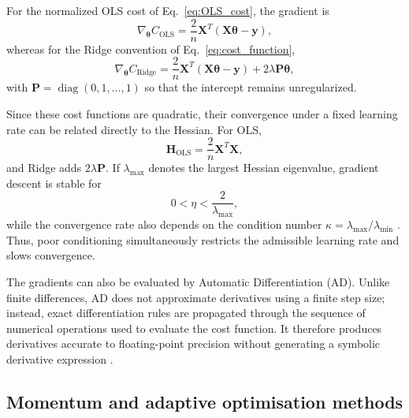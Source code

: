 \documentclass[aps,rmp,reprint,amsmath,amssymb,graphicx,longbibliography]{revtex4-1}
\begin{document}
For the normalized OLS cost of Eq.~\eqref{eq:OLS_cost}, the gradient is
\begin{equation}
    \nabla_{\boldsymbol{\theta}} C_{\mathrm{OLS}}
    =
    \frac{2}{n}
    \mathbf{X}^{T}
    \left(
    \mathbf{X}\boldsymbol{\theta}-\mathbf{y}
    \right),
    \label{eq:OLS_grad}
\end{equation}
whereas for the Ridge convention of Eq.~\eqref{eq:cost_function},
\begin{equation}
    \nabla_{\boldsymbol{\theta}} C_{\mathrm{Ridge}}
    =
    \frac{2}{n}
    \mathbf{X}^{T}
    \left(
    \mathbf{X}\boldsymbol{\theta}-\mathbf{y}
    \right)
    +
    2\lambda\mathbf{P}\boldsymbol{\theta},
    \label{eq:ridge_grad}
\end{equation}
with $\mathbf{P}=\operatorname{diag}(0,1,\ldots,1)$ so that the intercept
remains unregularized.

Since these cost functions are quadratic, their convergence under a fixed
learning rate can be related directly to the Hessian. For OLS,
\begin{equation}
    \mathbf{H}_{\mathrm{OLS}}
    =
    \frac{2}{n}\mathbf{X}^{T}\mathbf{X},
\end{equation}
and Ridge adds $2\lambda\mathbf{P}$. If
$\lambda_{\max}$ denotes the largest Hessian eigenvalue, gradient descent is
stable for
\begin{equation}
    0 < \eta < \frac{2}{\lambda_{\max}},
    \label{eq:gd_stability}
\end{equation}
while the convergence rate also depends on the condition number
$\kappa=\lambda_{\max}/\lambda_{\min}$ \cite{HjorthJensen2026MLPSCh4}. Thus, poor conditioning simultaneously restricts the admissible learning rate and slows convergence.

The gradients can also be evaluated by Automatic Differentiation (AD). Unlike
finite differences, AD does not approximate derivatives using a finite step
size; instead, exact differentiation rules are propagated through the sequence
of numerical operations used to evaluate the cost function. It therefore
produces derivatives accurate to floating-point precision without generating a
symbolic derivative expression \cite{HjorthJensen2026MLPSCh4}.

\subsection{Momentum and adaptive optimisation methods}
\label{subsec: Momentum and adaptative optimisation methods}
\end{document}

